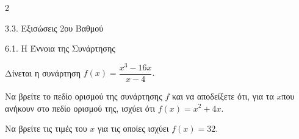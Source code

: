\begin{ylh}{2}
    \item 3.3. Εξισώσεις 2ου Βαθμού
    \item 6.1. Η Έννοια της Συνάρτησης
\end{ylh}
Δίνεται η συνάρτηση $f(x) = \dfrac{x^{3} - 16x}{x - 4}.$

\begin{alist}
\item Να βρείτε το πεδίο ορισμού της συνάρτησης $f$ και να αποδείξετε ότι, για τα $x$που ανήκουν στο πεδίο ορισμού της, ισχύει ότι $f(x) = x^{2} + 4x.$
\item Να βρείτε τις τιμές του $x$ για τις οποίες ισχύει $f(x) = 32.$
\end{alist}

